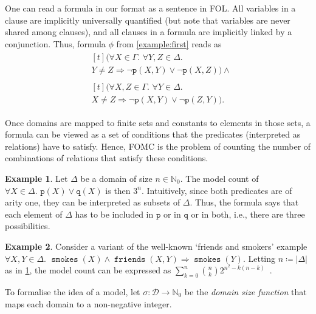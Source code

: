\documentclass{article}
\theoremstyle{definition}
\newtheorem{example}{Example}
\DeclareMathOperator{\friends}{\texttt{friends}}
\DeclareMathOperator{\smokes}{\texttt{smokes}}
\begin{document}
One can read a formula in our format as a sentence in FOL\@. All variables in a
clause are implicitly universally quantified (but note that variables are never
shared among clauses), and all clauses in a formula are implicitly linked by a
conjunction. Thus, formula $\phi$ from \cref{example:first} reads as
\begin{align*}
  &\begin{multlined}[t]
    (\forall X \in \Gamma\text{. }\forall Y, Z \in \Delta\text{. }\\
    Y \ne Z \Rightarrow \neg \texttt{p}(X, Y) \lor \neg \texttt{p}(X, Z)) \land
    \end{multlined}\\
  &\begin{multlined}[t]
    (\forall X, Z \in \Gamma\text{. }\forall Y \in \Delta\text{. }\\
    X \ne Z \Rightarrow \neg \texttt{p}(X, Y) \lor \neg \texttt{p}(Z, Y)).
    \end{multlined}
\end{align*}

Once domains are mapped to finite sets and constants to elements in those sets,
a formula can be viewed as a set of conditions that the predicates (interpreted
as relations) have to satisfy. Hence, FOMC is the problem of counting the number
of combinations of relations that satisfy these conditions.

\begin{example}\label{example:simple}
  Let $\Delta$ be a domain of size $n \in \mathbb{N}_{0}$. The model count of
  $\forall X \in \Delta\text{. } \texttt{p}(X) \lor \texttt{q}(X)$ is then
  $3^{n}$. Intuitively, since both predicates are of arity one, they can be
  interpreted as subsets of $\Delta$. Thus, the formula says that each element
  of $\Delta$ has to be included in $\texttt{p}$ or in $\texttt{q}$ or in both,
  i.e., there are three possibilities.
\end{example}

\begin{example}\label{example:smokers}
  Consider a variant of the well-known `friends and smokers' example
  $\forall X, Y \in \Delta\text{.
  } \smokes(X) \land \friends(X, Y) \Rightarrow \smokes(Y)$. Letting
  $n \coloneqq |\Delta|$ as in \cref{example:simple}, the model count can be
  expressed as
  $\sum_{k=0}^{n} \binom{n}{k}2^{n^{2} - k(n-k)}$~\cite{DBLP:conf/kr/BroeckMD14}.
\end{example}

To formalise the idea of a model, let
$\sigma\colon \mathcal{D} \to \mathbb{N}_{0}$ be the \emph{domain size function}
that maps each domain to a non-negative integer.
\end{document}
